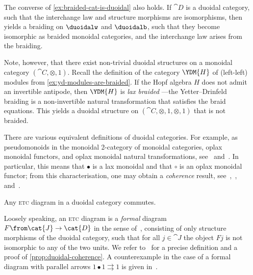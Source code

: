 \begin{example}\label{ex:strong-duoidal-is-braided}
  The converse of \cref{ex:braided-cat-is-duoidal} also holds.
  If \(\cat{D}\) is a duoidal category, such that the interchange law and structure morphisms are isomorphisms,
  then~\cite[Proposition~6.11]{Aguiar2010}
  yields a braiding on \(\duoidalw\) and \(\duoidalb\),
  such that they become isomorphic as braided monoidal categories,
  and the interchange law arises from the braiding.

  Note, however, that there exist non-trivial duoidal structures on a monoidal category \((\cat{C}, \otimes, 1)\).
  Recall the definition of the category \(\YDM{H}\) of (left-left) \YetterDrinfeld{} modules from \cref{ex:yd-modules-are-braided}.
  If the Hopf algebra \(H\) does not admit an invertible antipode,
  then \(\YDM{H}\) is \emph{lax braided}%
  —the Yetter–Drinfeld braiding is a non-invertible natural transformation that satisfies the braid equations.
  This yields a duoidal structure on \((\cat{C}, \otimes, 1, \otimes, 1)\) that is not braided.
\end{example}

There are various equivalent
definitions of duoidal categories.
For example, as pseudomonoids in the monoidal 2-category of monoidal categories,
oplax monoidal functors, and oplax monoidal natural transformations,
see~\cite[Proposition~6.72]{Aguiar2010} and~\cite[Definition~1]{garner16:commut}.
In particular, this means that \(\bullet\) is a lax monoidal and that \(\circ\) is an oplax monoidal functor;
from this characterisation, one may obtain a \emph{coherence} result,
see~\cite{lewis72:coher},~\cite[Section~6.2]{Aguiar2010}, and~\cite[Theorem~5.9]{malkiewich22:coher}.

\begin{proposition}\label{prop:duoidal-coherence}
  Any \textsc{etc} diagram in a duoidal category commutes.
\end{proposition}

Loosely speaking,
an \textsc{etc} diagram is a \emph{formal} diagram \(F\from \cat{J} \to \cat{D}\)
in the sense of~\cite[p.~20]{malkiewich22:coher},
consisting of only structure morphisms of the duoidal category,
such that for all \(j \in \cat{J}\)
the object \(Fj\) is not isomorphic to any of the two units.
We refer to~\cite[Definition~5.8 and Theorem~5.9]{malkiewich22:coher} for a precise definition and a proof of \cref{prop:duoidal-coherence}.
A counterexample in the case of a formal diagram with parallel arrows \(1 \bullet 1 \rightrightarrows 1\)
is given in~\cite[Proposition~3.1.6 and Example~3.1.7]{roman23:monoid-con}.

